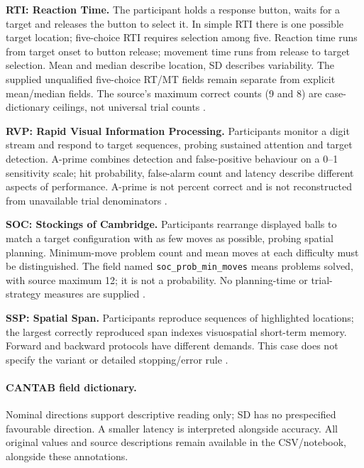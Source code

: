 \documentclass[11pt,a4paper]{article}
\begin{document}
\textbf{RTI: Reaction Time.} The participant holds a response button, waits for a target and releases the button to select it. In simple RTI there is one possible target location; five-choice RTI requires selection among five. Reaction time runs from target onset to button release; movement time runs from release to target selection. Mean and median describe location, SD describes variability. The supplied unqualified five-choice RT/MT fields remain separate from explicit mean/median fields. The source's maximum correct counts (9 and 8) are case-dictionary ceilings, not universal trial counts \citep{cantabrti}.

\textbf{RVP: Rapid Visual Information Processing.} Participants monitor a digit stream and respond to target sequences, probing sustained attention and target detection. A-prime combines detection and false-positive behaviour on a 0--1 sensitivity scale; hit probability, false-alarm count and latency describe different aspects of performance. A-prime is not percent correct and is not reconstructed from unavailable trial denominators \citep{cantabrvp}.

\textbf{SOC: Stockings of Cambridge.} Participants rearrange displayed balls to match a target configuration with as few moves as possible, probing spatial planning. Minimum-move problem count and mean moves at each difficulty must be distinguished. The field named \texttt{soc\_prob\_min\_moves} means problems solved, with source maximum 12; it is not a probability. No planning-time or trial-strategy measures are supplied \citep{cantabsoc}.

\textbf{SSP: Spatial Span.} Participants reproduce sequences of highlighted locations; the largest correctly reproduced span indexes visuospatial short-term memory. Forward and backward protocols have different demands. This case does not specify the variant or detailed stopping/error rule \citep{cantabssp}.

\small\normalsize
\paragraph{CANTAB field dictionary.} Nominal directions support descriptive reading only; SD has no prespecified favourable direction. A smaller latency is interpreted alongside accuracy. All original values and source descriptions remain available in the CSV/notebook, alongside these annotations.
\small\normalsize
\end{document}

